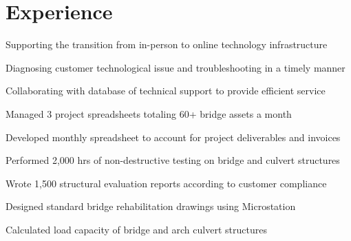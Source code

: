 \documentclass[letterpaper]{deedy-resume-openfont}
\begin{document}
\hfill
\begin{minipage}[t]{0.67\textwidth} 

\section{Experience}

\vspace{-0.1cm}
\vspace{\topsep} %
    \begin{tightemize}
        \item Supporting the transition from in-person to online technology infrastructure
        \item Diagnosing customer technological issue and troubleshooting in a timely manner
        \item Collaborating with database of technical support to provide efficient service
    \end{tightemize}
\sectionsep

\vspace{-0.1cm}
    \begin{tightemize}
        \item Managed 3 project spreadsheets totaling 60+ bridge assets a month
        \item Developed monthly spreadsheet to account for project deliverables and invoices
        \item Performed 2,000 hrs of non-destructive testing on bridge and culvert structures
        \item Wrote 1,500 structural evaluation reports according to customer compliance
        \item Designed standard bridge rehabilitation drawings using Microstation
        \item Calculated load capacity of bridge and arch culvert structures
    \end{tightemize}
\sectionsep


\end{minipage}
\end{document}
